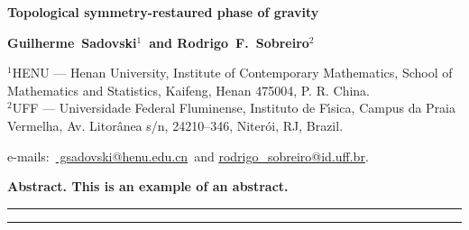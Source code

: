 \documentclass[main.tex]{subfiles}
\begin{document}
\thispagestyle{empty}
{
\noindent
\Large
\bfseries
Topological symmetry-restaured phase of gravity
\bigskip
\bigskip
}

{
\noindent
\bfseries
Guilherme~Sadovski${}^{1}${\normalfont~and}
Rodrigo~F.~Sobreiro${}^{2}$
\bigskip
}

{
\noindent
\footnotesize
${}^{1}$HENU --- Henan University, Institute of Contemporary Mathematics, School of Mathematics and Statistics, Kaifeng, Henan 475004, P. R. China. \\
${}^{2}$UFF --- Universidade Federal Fluminense, Instituto de F{\'{\i}}sica, Campus da Praia Vermelha, Av. Litor{\^{a}}nea s/n, 24210--346, Niter{\'{o}}i, RJ, Brazil.
\bigskip
\bigskip
}

{
\noindent
\footnotesize
\rmfamily
e-mails:~\href{
  mailto:gsadovski@henu.edu.cn}{
  gsadovski@henu.edu.cn}{\normalfont~and}
\href{
  mailto:rodrigo\_sobreiro@id.uff.br
}{
  rodrigo\_sobreiro@id.uff.br}{\normalfont.}
\bigskip
}

{
\noindent
\bfseries
Abstract.
\normalfont{}
This is an example of an abstract.
\bigskip
}

{
\noindent
\rule{\textwidth}{1pt}
\tableofcontents
\smallskip
\noindent
\rule{\linewidth}{1pt}
}
\end{document}

